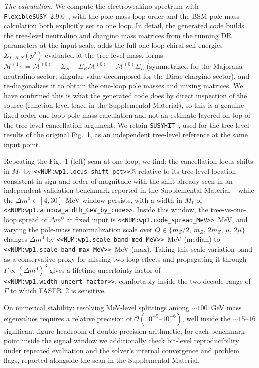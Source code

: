 \documentclass{ar2rc}
\begin{document}
\textit{The calculation.} We compute the electroweakino spectrum with \texttt{FlexibleSUSY}~2.9.0~\cite{Athron:2014yba, Athron:2017fvs}, with the pole-mass loop order and the BSM pole-mass calculation both explicitly set to one loop. In detail, the generated code builds the tree-level neutralino and chargino mass matrices from the running $\overline{\text{DR}}$ parameters at the input scale, adds the full one-loop chiral self-energies $\Sigma_{L,R,S}(p^2)$ evaluated at the tree-level mass, forms $\mathcal{M}^{(1)}=\mathcal{M}^{(0)}-\Sigma_S-\Sigma_R\mathcal{M}^{(0)}-\mathcal{M}^{(0)}\Sigma_L$ (symmetrized for the Majorana neutralino sector; singular-value decomposed for the Dirac chargino sector), and re-diagonalizes it to obtain the one-loop pole masses and mixing matrices. We have confirmed this is what the generated code does by direct inspection of the source (function-level trace in the Supplemental Material), so this is a genuine fixed-order one-loop pole-mass calculation and not an estimate layered on top of the tree-level cancellation argument. We retain \texttt{SUSYHIT}~\cite{Djouadi:2006bz}, used for the tree-level results of the original Fig.~1, as an independent tree-level reference at the same input point.

Repeating the Fig.~1 (left) scan at one loop, we find: the cancellation locus shifts in $M_1$ by \texttt{<<NUM:wp1.locus\_shift\_pct>>}\% relative to its tree-level location -- consistent in sign and order of magnitude with the shift already seen in an independent validation benchmark reported in the Supplemental Material -- while the $\Delta m^0\in[4,30]$~MeV window persists, with a width in $M_1$ of \texttt{<<NUM:wp1.window\_width\_GeV\_by\_code>>}. Inside this window, the tree-vs-one-loop spread of $\Delta m^0$ at fixed input is \texttt{<<NUM:wp1.code\_spread\_MeV>>}~MeV, and varying the pole-mass renormalization scale over $Q\in\{m_Z/2,\,m_Z,\,2m_Z,\,\mu,\,2\mu\}$ changes $\Delta m^0$ by \texttt{<<NUM:wp1.scale\_band\_med\_MeV>>}~MeV (median) to \texttt{<<NUM:wp1.scale\_band\_max\_MeV>>}~MeV (max). Taking this scale-variation band as a conservative proxy for missing two-loop effects and propagating it through $\Gamma\propto(\Delta m^0)^3$ gives a lifetime-uncertainty factor of \texttt{<<NUM:wp1.width\_uncert\_factor>>}, comfortably inside the two-decade range of $\Gamma$ to which FASER~2 is sensitive.

On numerical stability: resolving MeV-level splittings among $\sim 100$~GeV mass eigenvalues requires a relative precision of $\mathcal{O}(10^{-5}\text{--}10^{-6})$, well inside the $\sim 15$--$16$ significant-figure headroom of double-precision arithmetic; for each benchmark point inside the signal window we additionally check bit-level reproducibility under repeated evaluation and the solver's internal convergence and problem flags, reported alongside the scan in the Supplemental Material.
\end{document}
